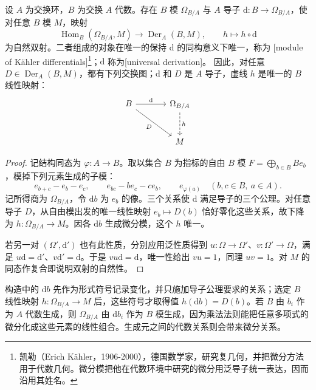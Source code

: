 \begin{theorem}\label{b3:thm:universal-differentials}
	设 \(A\) 为交换环，\(B\) 为交换 \(A\) 代数。存在 \(B\) 模 \(\Omega_{B/A}\) 与 \(A\) 导子 \(\mathrm{d}:B\rightarrow\Omega_{B/A}\)，使对任意 \(B\) 模 \(M\)，映射
	\[
		\operatorname{Hom}_B(\Omega_{B/A},M)\longrightarrow \operatorname{Der}_A(B,M),\qquad h\longmapsto h\circ \mathrm{d}
	\]
	为自然双射。二者组成的对象在唯一的保持 \(\mathrm{d}\) 的同构意义下唯一，称为 [module of Kähler differentials]\footnote{凯勒（Erich Kähler，1906-2000），德国数学家，研究复几何，并把微分方法用于代数几何。微分模把他在代数环境中研究的微分用泛导子统一表达，因而沿用其姓名。}；\(\mathrm{d}\) 称为[universal derivation]。 因此，对任意 \(D\in\operatorname{Der}_A(B,M)\)，都有下列交换图；\(\mathrm{d}\) 和 \(D\) 是 \(A\) 导子，虚线 \(h\) 是唯一的 \(B\) 线性映射：
	\[
		\begin{tikzcd}[column sep=large,row sep=large]
			B\arrow[r,"\mathrm{d}"]\arrow[dr,"D"'] &\Omega_{B/A}\arrow[d,dashed,"h"]\\
			&M
		\end{tikzcd}
	\]
\end{theorem}
\begin{proof}
	记结构同态为 \(\varphi:A\to B\)。取以集合 \(B\) 为指标的自由 \(B\) 模 \(F=\bigoplus_{b\in B}Be_b\)，模掉下列元素生成的子模：
	\[
		e_{b+c}-e_b-e_c,\qquad e_{bc}-be_c-ce_b,\qquad e_{\varphi(a)} \quad(b,c\in B,\ a\in A).
	\]
	记所得商为 \(\Omega_{B/A}\)，令 \(\mathrm{d}b\) 为 \(e_b\) 的像。三个关系使 \(\mathrm{d}\) 满足导子的三个公理。对任意导子 \(D\)，从自由模出发的唯一线性映射 \(e_b\mapsto D(b)\) 恰好零化这些关系，故下降为 \(h:\Omega_{B/A}\rightarrow M\)。因各 \(\mathrm{d}b\) 生成微分模，这个 \(h\) 唯一。

	若另一对 \((\Omega',\mathrm{d}')\) 也有此性质，分别应用泛性质得到 \(u:\Omega\rightarrow\Omega'\)、\(v:\Omega'\rightarrow\Omega\)，满足 \(u\mathrm{d}=\mathrm{d}'\)、\(v\mathrm{d}'=\mathrm{d}\)。于是 \(vu\mathrm{d}=\mathrm{d}\)，唯一性给出 \(vu=1\)，同理 \(uv=1\)。对 \(M\) 的同态作复合即说明双射的自然性。
\end{proof}

构造中的 \(\mathrm{d}b\) 先作为形式符号记录变化，并只施加导子公理要求的关系；选定 \(B\) 线性映射 \(h:\Omega_{B/A}\to M\) 后，这些符号才取得值 \(h(\mathrm{d}b)=D(b)\)。若 \(B\) 由 \(b_i\) 作为 \(A\) 代数生成，则 \(\Omega_{B/A}\) 由 \(\mathrm{d}b_i\) 作为 \(B\) 模生成，因为乘法法则能把任意多项式的微分化成这些元素的线性组合。生成元之间的代数关系则会带来微分关系。

